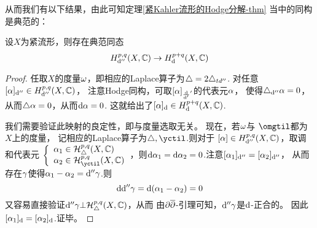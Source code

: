 从而我们有以下结果，由此可知定理\ref{紧Kahler流形的Hodge分解-thm}
当中的同构是典范的：

\begin{prop}设$X$为紧\Kahler 流形，则存在典范同态
$$
  H^{p,q}_{\mathrm{d}''}(X,\mathbb{C})\to H^{p+q}_{\mathrm{d}}(X,\mathbb{C})
$$
\end{prop}

\begin{proof}
任取$X$的\Kahler 度量$\omega$，即相应的Laplace算子为$\triangle=2\triangle_{td''}$.
对任意$[\alpha]_{\mathrm{d}''}\in H^{p,q}_{\mathrm{d}''}(X,\mathbb{C})$，
注意Hodge同构，可取$[\alpha]_{\frac{\mathrm{d} } {\mathrm{d} '}'}$的代表元$\alpha$，
使得$\triangle_{\mathrm{d}''}\alpha=0$，从而$\triangle\alpha=0$，从而$\mathrm{d}\alpha=0$.
这就给出了$[\alpha]_{\mathrm{d}}\in H^{p+q}_{\mathrm{d}}(X,\mathbb{C})$.

我们需要验证此映射的良定性，即与\Kahler 度量选取无关。
现在，若$\omega$与 $\omgtil$都为$X$上的\Kahler 度量，
记相应的Laplace算子为$\yc,\yctil$.则对于
$[\alpha]\in H^{p,q}_{\mathrm{d}''}(X,\mathbb{C})$，取调和代表元
$
  \left\{
    \begin{array}{l}
      \afa_1\in\mcalH^{p,q}_{\yc}(X,\bbC)\\
      \afa_2\in\mcalH^{p,q}_{\yctil}(X,\bbC)
    \end{array}
  \right.
$，则$\mathrm{d}\alpha_1=\mathrm{d}\alpha_2=0$.注意$[\alpha_1]_{\mathrm{d}''}=[\alpha_2]_{\mathrm{d}''}$，
从而存在$\gamma$使得$\alpha_1-\alpha_2=\mathrm{d}''\gamma$.则
$$\mathrm{d}\mathrm{d}''\gamma=\mathrm{d}(\alpha_1-\alpha_2)=0$$
又容易直接验证$\mathrm{d}''\gamma\bot\mathcal{H}^{p,q}_{\triangle}(X,\mathbb{C})$，从而
由$\partial\overline{\partial}$-引理可知，$\mathrm{d}''\gamma$是$\mathrm{d}$-正合的。
因此$[\alpha_1]_{\mathrm{d}}=[\alpha_2]_{\mathrm{d}}$.证毕。
\end{proof}

